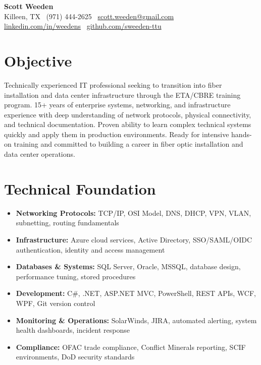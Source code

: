 \documentclass[10pt,letterpaper]{article}
\begin{document}
\begin{center}
    {\LARGE \bfseries Scott Weeden}\\[6pt]
    Killeen, TX \textbullet\ (971) 444-2625 \textbullet\ \href{mailto:scott.weeden@gmail.com}{scott.weeden@gmail.com}\\
    \href{https://www.linkedin.com/in/weedens}{linkedin.com/in/weedens} \textbullet\ \href{https://github.com/sweeden-ttu}{github.com/sweeden-ttu}
\end{center}

\vspace{4pt}

\section{Objective}
Technically experienced IT professional seeking to transition into fiber installation and data center infrastructure through the ETA/CBRE training program. 15+ years of enterprise systems, networking, and infrastructure experience with deep understanding of network protocols, physical connectivity, and technical documentation. Proven ability to learn complex technical systems quickly and apply them in production environments. Ready for intensive hands-on training and committed to building a career in fiber optic installation and data center operations.

\section{Technical Foundation}
\begin{itemize}
    \item \textbf{Networking Protocols:} TCP/IP, OSI Model, DNS, DHCP, VPN, VLAN, subnetting, routing fundamentals
    \item \textbf{Infrastructure:} Azure cloud services, Active Directory, SSO/SAML/OIDC authentication, identity and access management
    \item \textbf{Databases \& Systems:} SQL Server, Oracle, MSSQL, database design, performance tuning, stored procedures
    \item \textbf{Development:} C\#, .NET, ASP.NET MVC, PowerShell, REST APIs, WCF, WPF, Git version control
    \item \textbf{Monitoring \& Operations:} SolarWinds, JIRA, automated alerting, system health dashboards, incident response
    \item \textbf{Compliance:} OFAC trade compliance, Conflict Minerals reporting, SCIF environments, DoD security standards
\end{itemize}
\end{document}
